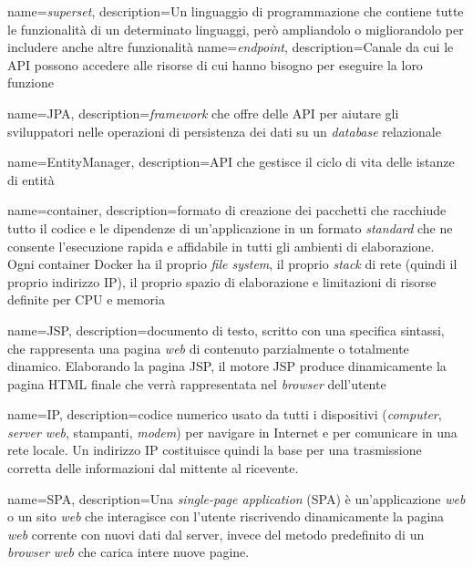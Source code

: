 {
    name=\textit{superset},
    description={Un linguaggio di programmazione che contiene tutte le funzionalità di un determinato linguaggi, però ampliandolo o migliorandolo per includere anche altre funzionalità}
}
{
    name=\textit{endpoint},
    description={Canale da cui le \gls{API} possono accedere alle risorse di cui hanno bisogno per eseguire la loro funzione}
}

{
    name=JPA,
    description={\textit{framework} che offre delle \gls{API} per aiutare gli sviluppatori nelle operazioni di persistenza dei dati su un \textit{database} relazionale}
}


{
    name=EntityManager,
    description={API che gestisce il ciclo di vita delle istanze di entità}
}

{
    name=container,
    description={formato di creazione dei pacchetti che racchiude tutto il codice e le dipendenze di un'applicazione in un formato \textit{standard} che ne consente l'esecuzione rapida e affidabile in tutti gli ambienti di elaborazione.\\ Ogni container Docker ha il proprio \textit{file system}, il proprio \textit{stack} di rete (quindi il proprio indirizzo \gls{IP}), il proprio spazio di elaborazione e limitazioni di risorse definite per CPU e memoria}
}

{
    name=JSP,
    description={documento di testo, scritto con una specifica sintassi, che rappresenta una pagina \textit{web} di contenuto parzialmente o totalmente dinamico. Elaborando la pagina JSP, il motore JSP produce dinamicamente la pagina HTML finale che verrà rappresentata nel \textit{browser} dell'utente}
}

{
    name=IP,
    description={codice numerico usato da tutti i dispositivi (\textit{computer}, \textit{server web}, stampanti, \textit{modem}) per navigare in Internet e per comunicare in una rete locale. Un indirizzo IP costituisce quindi la base per una trasmissione corretta delle informazioni dal mittente al ricevente.}
}

{
    name=SPA,
    description={Una \textit{single-page application} (SPA) è un'applicazione \textit{web} o un sito \textit{web} che interagisce con l'utente riscrivendo dinamicamente la pagina \textit{web} corrente con nuovi dati dal server, invece del metodo predefinito di un \textit{browser} \textit{web} che carica intere nuove pagine.}
}

